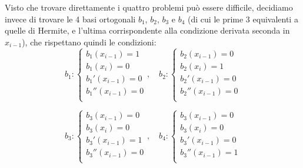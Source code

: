 \documentclass[a4paper,11pt]{article}
\begin{document}
\begin{itemize}
		Visto che trovare direttamente i quattro problemi può essere difficile, decidiamo invece di trovare le 4 basi ortogonali $b_1$, $b_2$, $b_3$ e $b_4$ (di cui le prime 3 equivalenti a quelle di Hermite, e l'ultima corrispondente alla condizione derivata seconda in $x_{i - 1}$), che rispettano quindi le condizioni:
		$$
		b_1 : 
		\begin{cases}
			b_1(x_{i - 1}) = 1 \\
			b_1(x_i) = 0 \\
			b_1'(x_{i - 1}) = 0 \\
			b_1''(x_{i - 1}) = 0 \\
		\end{cases}, \quad
		b_2 : 
		\begin{cases}
			b_2(x_{i - 1}) = 0 \\
			b_2(x_i) = 1 \\
			b_2'(x_{i - 1}) = 0 \\
			b_2''(x_{i - 1}) = 0 \\
		\end{cases}
		$$

		$$
		b_3 : 
		\begin{cases}
			b_3(x_{i - 1}) = 0 \\
			b_3(x_i) = 0 \\
			b_3'(x_{i - 1}) = 1 \\
			b_3''(x_{i - 1}) = 0 \\
		\end{cases}, \quad
		b_4 : 
		\begin{cases}
			b_3(x_{i - 1}) = 0 \\
			b_3(x_i) = 0 \\
			b_3'(x_{i - 1}) = 0 \\
			b_3''(x_{i - 1}) = 1 \\
		\end{cases}
		$$


\end{itemize}
\end{document}
